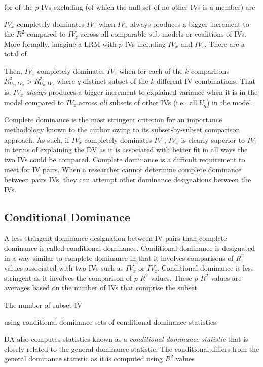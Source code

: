 \documentclass[ShortAfour,times,sageapa]{sagej}
\begin{document}
	 for of the $p$ IVs excluding (of which the null set of no other IVs is a member) are 
			
	$IV_x$ completely dominates $IV_z$ when $IV_x$ always produces a bigger increment to the $R^2$ compared to $IV_z$ across all comparable sub-models or coalitions of IVs.
	More formally, imagine a LRM with $p$ IVs including $IV_x$ and $IV_z$.
	There are a total of 
	
	Then, $IV_x$ completely dominates $IV_z$ when for each of the $k$ comparisons $R^2_{U_q, IV_x} > R^2_{U_q, IV_z}$ where $q$ distinct subset of the $k$ different IV combinations.
	That is, $IV_x$ \emph{always} produces a bigger increment to explained variance when it is in the model compared to $IV_z$ across \emph{all} subsets of other IVs (i.e., all $U_q$) in the model.
	
	Complete dominance is the most stringent criterion for an importance methodology known to the author owing to its subset-by-subset comparison approach.
	As such, if $IV_x$ completely dominates $IV_z$, $IV_x$ is clearly superior to $IV_z$ in terms of explaining the DV as it is associated with better fit in all ways the two IVs could be compared.
	Complete dominance is a difficult requirement to meet for IV pairs.
	When a researcher cannot determine complete dominance between pairs IVs, they can attempt other dominance designations between the IVs.
	
	\subsection{Conditional Dominance}
	
	A less stringent dominance designation between IV pairs than complete dominance is called conditional dominance.
	Conditional dominance is designated in a way similar to complete dominance in that it involves comparisons of $R^2$ values associated with two IVs such as $IV_x$ or $IV_z$.
	Conditional dominance is less stringent as it involves the comparison of $p$ $R^2$ values.
	These $p$ $R^2$ values are averages based on the number of IVs that comprise the subset.
	
	The number of subset IV
	
	 using conditional dominance sets of conditional dominance statistics
	
	
	DA also computes statistics known as a \emph{conditional dominance statistic} that is closely related to the general dominance statistic.  
	The conditional differs from the general dominance statistic as it is computed using $R^2$ values
	
\end{document}
